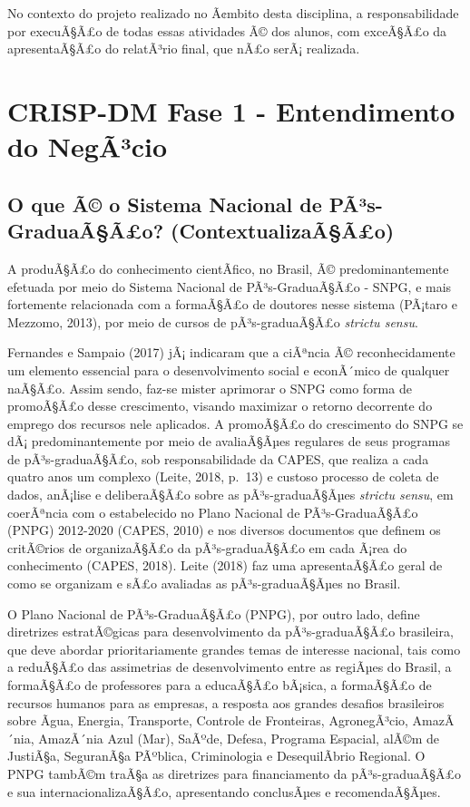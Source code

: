 \documentclass[]{article}
\begin{document}
No contexto do projeto realizado no Ã¢mbito desta disciplina, a
responsabilidade por execuÃ§Ã£o de todas essas atividades Ã© dos alunos,
com exceÃ§Ã£o da apresentaÃ§Ã£o do relatÃ³rio final, que nÃ£o serÃ¡
realizada.

\section{CRISP-DM Fase 1 - Entendimento do
NegÃ³cio}\label{crisp-dm-fase-1---entendimento-do-negacio}

\subsection{O que Ã© o Sistema Nacional de PÃ³s-GraduaÃ§Ã£o?
(ContextualizaÃ§Ã£o)}\label{o-que-a-o-sistema-nacional-de-pas-graduaaao-contextualizaaao}

A produÃ§Ã£o do conhecimento cientÃ­fico, no Brasil, Ã©
predominantemente efetuada por meio do Sistema Nacional de
PÃ³s-GraduaÃ§Ã£o - SNPG, e mais fortemente relacionada com a formaÃ§Ã£o
de doutores nesse sistema (PÃ¡taro e Mezzomo, 2013), por meio de cursos
de pÃ³s-graduaÃ§Ã£o \emph{strictu sensu}.

Fernandes e Sampaio (2017) jÃ¡ indicaram que a ciÃªncia Ã©
reconhecidamente um elemento essencial para o desenvolvimento social e
econÃ´mico de qualquer naÃ§Ã£o. Assim sendo, faz-se mister aprimorar o
SNPG como forma de promoÃ§Ã£o desse crescimento, visando maximizar o
retorno decorrente do emprego dos recursos nele aplicados. A promoÃ§Ã£o
do crescimento do SNPG se dÃ¡ predominantemente por meio de avaliaÃ§Ãµes
regulares de seus programas de pÃ³s-graduaÃ§Ã£o, sob responsabilidade da
CAPES, que realiza a cada quatro anos um complexo (Leite, 2018, p.~13) e
custoso processo de coleta de dados, anÃ¡lise e deliberaÃ§Ã£o sobre as
pÃ³s-graduaÃ§Ãµes \emph{strictu sensu}, em coerÃªncia com o estabelecido
no Plano Nacional de PÃ³s-GraduaÃ§Ã£o (PNPG) 2012-2020 (CAPES, 2010) e
nos diversos documentos que definem os critÃ©rios de organizaÃ§Ã£o da
pÃ³s-graduaÃ§Ã£o em cada Ã¡rea do conhecimento (CAPES, 2018). Leite
(2018) faz uma apresentaÃ§Ã£o geral de como se organizam e sÃ£o
avaliadas as pÃ³s-graduaÃ§Ãµes no Brasil.

O Plano Nacional de PÃ³s-GraduaÃ§Ã£o (PNPG), por outro lado, define
diretrizes estratÃ©gicas para desenvolvimento da pÃ³s-graduaÃ§Ã£o
brasileira, que deve abordar prioritariamente grandes temas de interesse
nacional, tais como a reduÃ§Ã£o das assimetrias de desenvolvimento entre
as regiÃµes do Brasil, a formaÃ§Ã£o de professores para a educaÃ§Ã£o
bÃ¡sica, a formaÃ§Ã£o de recursos humanos para as empresas, a resposta
aos grandes desafios brasileiros sobre Ãgua, Energia, Transporte,
Controle de Fronteiras, AgronegÃ³cio, AmazÃ´nia, AmazÃ´nia Azul (Mar),
SaÃºde, Defesa, Programa Espacial, alÃ©m de JustiÃ§a, SeguranÃ§a
PÃºblica, Criminologia e DesequilÃ­brio Regional. O PNPG tambÃ©m traÃ§a
as diretrizes para financiamento da pÃ³s-graduaÃ§Ã£o e sua
internacionalizaÃ§Ã£o, apresentando conclusÃµes e recomendaÃ§Ãµes.
\end{document}
